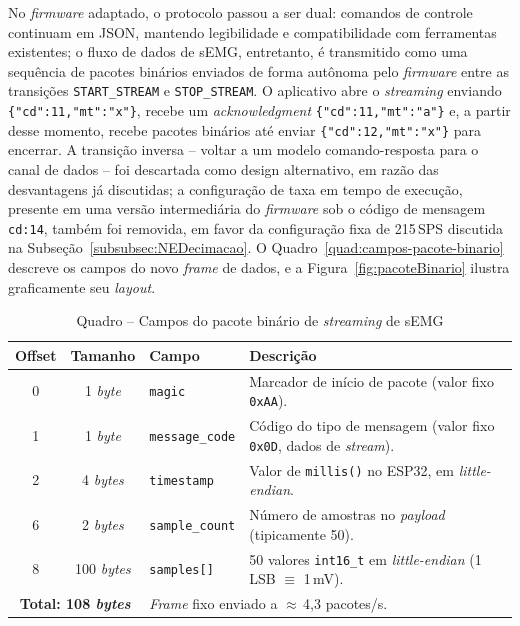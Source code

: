 No \textit{firmware} adaptado, o protocolo passou a ser dual: comandos de controle continuam em JSON, mantendo legibilidade e compatibilidade com ferramentas existentes; o fluxo de dados de sEMG, entretanto, é transmitido como uma sequência de pacotes binários enviados de forma autônoma pelo \textit{firmware} entre as transições \texttt{START\_STREAM} e \texttt{STOP\_STREAM}. O aplicativo abre o \textit{streaming} enviando \verb|{"cd":11,"mt":"x"}|, recebe um \textit{acknowledgment} \verb|{"cd":11,"mt":"a"}| e, a partir desse momento, recebe pacotes binários até enviar \verb|{"cd":12,"mt":"x"}| para encerrar. A transição inversa -- voltar a um modelo comando-resposta para o canal de dados -- foi descartada como design alternativo, em razão das desvantagens já discutidas; a configuração de taxa em tempo de execução, presente em uma versão intermediária do \textit{firmware} sob o código de mensagem \texttt{cd:14}, também foi removida, em favor da configuração fixa de 215\,SPS discutida na Subseção~\ref{subsubsec:NEDecimacao}. O Quadro~\ref{quad:campos-pacote-binario} descreve os campos do novo \textit{frame} de dados, e a Figura~\ref{fig:pacoteBinario} ilustra graficamente seu \textit{layout}.

\begin{table}[htb]
    \centering
    \caption{Quadro -- Campos do pacote binário de \textit{streaming} de sEMG}\label{tab:campos-pacote-binario}
    \begin{tabular}{|c|c|l|p{6cm}|}
        \hline
        \textbf{Offset} & \textbf{Tamanho} & \textbf{Campo} & \textbf{Descrição} \\
        \hline
        0 & 1 \textit{byte} & \texttt{magic} & Marcador de início de pacote (valor fixo \texttt{0xAA}). \\
        \hline
        1 & 1 \textit{byte} & \texttt{message\_code} & Código do tipo de mensagem (valor fixo \texttt{0x0D}, dados de \textit{stream}). \\
        \hline
        2 & 4 \textit{bytes} & \texttt{timestamp} & Valor de \texttt{millis()} no ESP32, em \textit{little-endian}. \\
        \hline
        6 & 2 \textit{bytes} & \texttt{sample\_count} & Número de amostras no \textit{payload} (tipicamente 50). \\
        \hline
        8 & 100 \textit{bytes} & \texttt{samples[]} & 50 valores \texttt{int16\_t} em \textit{little-endian} (1\,LSB $\equiv$ 1\,mV). \\
        \hline
        \multicolumn{2}{|c|}{\textbf{Total: 108 \textit{bytes}}} & \multicolumn{2}{l|}{\textit{Frame} fixo enviado a $\approx$\,4,3 pacotes/s.} \\
        \hline
    \end{tabular}
\end{table}

